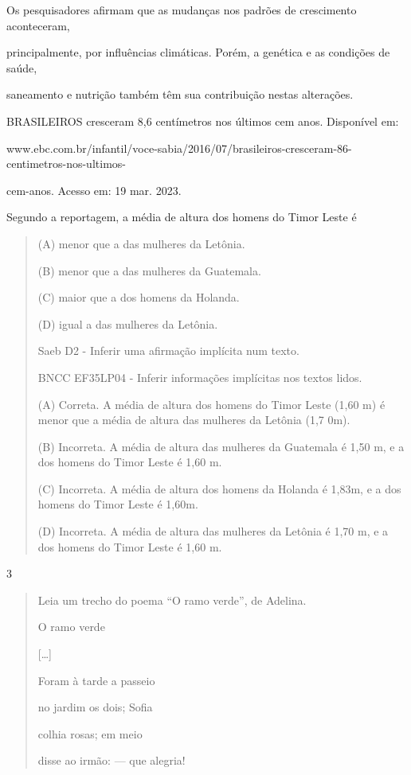 \begin{escolha}
\begin{escolha}
{Os pesquisadores afirmam que as mudanças nos padrões de crescimento
aconteceram,

principalmente, por influências climáticas. Porém, a genética e as
condições de saúde,

saneamento e nutrição também têm sua contribuição nestas alterações.

BRASILEIROS cresceram 8,6 centímetros nos últimos cem anos. Disponível
em:

www.ebc.com.br/infantil/voce-sabia/2016/07/brasileiros-cresceram-86-centimetros-nos-ultimos-

cem-anos. Acesso em: 19 mar. 2023.

Segundo a reportagem, a média de altura dos homens do Timor Leste é

\begin{quote}
(A) menor que a das mulheres da Letônia.

(B) menor que a das mulheres da Guatemala.

(C) maior que a dos homens da Holanda.

(D) igual a das mulheres da Letônia.

Saeb D2 - Inferir uma afirmação implícita num texto.

BNCC EF35LP04 - Inferir informações implícitas nos textos lidos.

(A) Correta. A média de altura dos homens do Timor Leste (1,60 m) é
menor que a média de altura das mulheres da Letônia (1,7 0m).

(B) Incorreta. A média de altura das mulheres da Guatemala é 1,50 m, e a
dos homens do Timor Leste é 1,60 m.

(C) Incorreta. A média de altura dos homens da Holanda é 1,83m, e a dos
homens do Timor Leste é 1,60m.

(D) Incorreta. A média de altura das mulheres da Letônia é 1,70 m, e a
dos homens do Timor Leste é 1,60 m.
\end{quote}

\num{3}

\begin{quote}
Leia um trecho do poema ``O ramo verde'', de Adelina.

O ramo verde

{[}\ldots{}{]}

Foram à tarde a passeio

no jardim os dois; Sofia

colhia rosas; em meio

disse ao irmão: --- que alegria!


\end{quote}}
\end{escolha}
\end{escolha}

